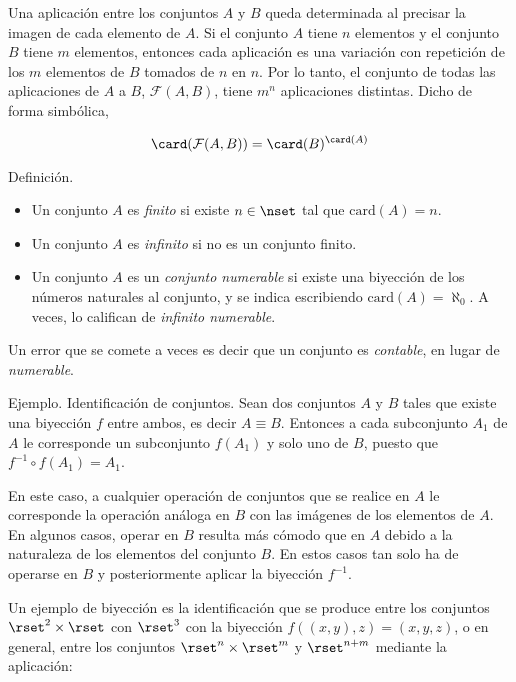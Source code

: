 
Una aplicación entre los conjuntos $A$ y $B$ queda determinada al precisar
la imagen de cada elemento de $A$. Si el conjunto $A$ tiene $n$ elementos y
el conjunto $B$ tiene $m$ elementos, entonces cada aplicación es una
variación con repetición de los $m$ elementos de $B$ tomados de $n$ en $n$.
Por lo tanto, el conjunto de todas las aplicaciones de $A$ a $B$,
$\mathcal{F}(A, B)$, tiene $m^n$ aplicaciones distintas. Dicho de forma
simbólica,

$$ \card(\mathcal{F}(A, B)) = \card(B)^{\card(A)} $$

Definición.

\begin{itemize}
  \item Un conjunto $A$ es \emph{finito} si existe $n \in \nset$ tal que
    $\text{card}(A) = n$.

  \item Un conjunto $A$ es \emph{infinito} si no es un conjunto finito.

  \item Un conjunto $A$ es un \emph{conjunto numerable} si existe una
    biyección de los números naturales al conjunto, y se indica escribiendo
    $\text{card}(A) = \aleph_0$. A veces, lo califican de \emph{infinito
    numerable}.
\end{itemize}

Un error que se comete a veces es decir que un conjunto es \emph{contable},
en lugar de \emph{numerable}.

Ejemplo. Identificación de conjuntos. Sean dos conjuntos $A$ y $B$ tales que
existe una biyección $f$ entre ambos, es decir $A \equiv B$. Entonces a cada
subconjunto $A_1$ de $A$ le corresponde un subconjunto $f(A_1)$ y solo uno
de $B$, puesto que $f^{-1} \circ f(A_1) = A_1$.

En este caso, a cualquier operación de conjuntos que se realice en $A$ le
corresponde la operación análoga en $B$ con las imágenes de los elementos de
$A$. En algunos casos, operar en $B$ resulta más cómodo que en $A$ debido a
la naturaleza de los elementos del conjunto $B$. En estos casos tan solo ha
de operarse en $B$ y posteriormente aplicar la biyección $f^{-1}$.

Un ejemplo de biyección es la identificación que se produce entre los
conjuntos $\rset^2 \times \rset$ con $\rset^3$ con la biyección $f((x, y),
z) = (x, y, z)$, o en general, entre los conjuntos $\rset^n \times \rset^m$
y $\rset^{n+m}$ mediante la aplicación:

